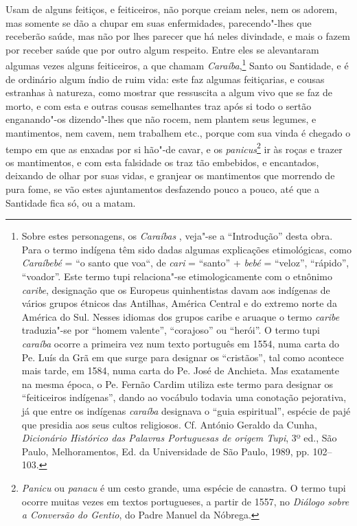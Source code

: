  Usam de alguns feitiços, e feiticeiros, não porque creiam neles, nem os
adorem, mas somente se dão a chupar em suas enfermidades,
parecendo"-lhes que receberão saúde, mas não por lhes parecer que há
neles divindade, e mais o fazem por receber saúde que por outro algum
respeito. Entre eles se alevantaram algumas vezes alguns feiticeiros, a
que chamam \textit{Caraíba},\footnote{ Sobre estes personagens, os
\textit{Caraíbas }, veja"-se a ``Introdução'' desta obra. Para o termo
indígena têm sido dadas algumas explicações etimológicas, como
\textit{Caraíbebé} = ``o santo que voa``, de \textit{cari} = ``santo'' +
\textit{bebé} = ``veloz'', ``rápido'', ``voador''. Este termo tupi
relaciona"-se etimologicamente com o etnônimo \textit{caribe},
designação que os Europeus quinhentistas davam aos indígenas de vários
grupos étnicos das Antilhas, América Central e do extremo norte da
América do Sul. Nesses idiomas dos grupos caribe e aruaque o termo
\textit{caribe} traduzia"-se por ``homem valente'', ``corajoso'' ou ``herói''.
O termo tupi \textit{caraíba} ocorre a primeira vez num texto português
em 1554, numa carta do Pe. Luís da Grã em que surge
para designar os ``cristãos'', tal como acontece mais tarde, em 1584, 
numa carta do Pe. José de Anchieta. Mas exatamente na mesma
época, o Pe. Fernão Cardim utiliza este termo para designar os
``feiticeiros indígenas'', dando ao vocábulo todavia uma conotação
pejorativa, já que entre os indígenas \textit{caraíba} designava o
``guia espiritual'', espécie de pajé que presidia aos seus cultos
religiosos. Cf. António Geraldo da Cunha, \textit{Dicionário Histórico
das Palavras Portuguesas de origem Tupi}, 3º ed., São Paulo,
Melhoramentos, Ed. da Universidade de São Paulo, 1989, pp. 102--103.} 
Santo ou Santidade, e é de ordinário algum índio de ruim vida: este faz 
algumas feitiçarias, e cousas estranhas à natureza, como mostrar que 
ressuscita a algum vivo que se faz de morto, e com esta e outras cousas semelhantes traz após si todo
o sertão enganando"-os dizendo"-lhes que não rocem, nem plantem seus
legumes, e mantimentos, nem cavem, nem trabalhem etc., porque com sua
vinda é chegado o tempo em que as enxadas por si hão"-de cavar, e os
\textit{panicus}\footnote{ \textit{Panicu} ou \textit{panacu} é um
cesto grande, uma espécie de canastra. O termo tupi ocorre muitas vezes
em textos portugueses, a partir de 1557, no \textit{Diálogo sobre a
Conversão do Gentio}, do Padre Manuel da Nóbrega.} ir às roças
e trazer os mantimentos, e com esta falsidade os traz tão embebidos, e
encantados, deixando de olhar por suas vidas, e granjear os mantimentos
que morrendo de pura fome, se vão estes ajuntamentos desfazendo pouco a
pouco, até que a Santidade fica só, ou a matam.

